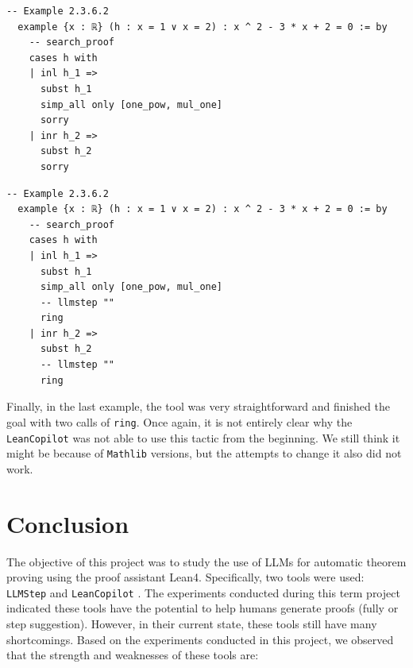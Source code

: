 \documentclass[12pt]{article}
\newcommand{\leancopilot}{\texttt{LeanCopilot} }
\newcommand{\llmstep}{\texttt{LLMStep} }
\begin{document}
\begin{minipage}{0.495\textwidth}
  \begin{lstlisting}[title={\leancopilot proof}]
  -- Example 2.3.6.2
  example {x : ℝ} (h : x = 1 ∨ x = 2) : x ^ 2 - 3 * x + 2 = 0 := by
    -- search_proof
    cases h with
    | inl h_1 =>
      subst h_1
      simp_all only [one_pow, mul_one]
      sorry
    | inr h_2 =>
      subst h_2
      sorry
  \end{lstlisting}
\end{minipage}
\vline
\begin{minipage}{0.495\textwidth}
  \begin{lstlisting}[title={\llmstep proof continuation}]
  -- Example 2.3.6.2
  example {x : ℝ} (h : x = 1 ∨ x = 2) : x ^ 2 - 3 * x + 2 = 0 := by
    -- search_proof
    cases h with
    | inl h_1 =>
      subst h_1
      simp_all only [one_pow, mul_one]
      -- llmstep ""
      ring
    | inr h_2 =>
      subst h_2
      -- llmstep ""
      ring
  \end{lstlisting}
\end{minipage}

Finally, in the last example, the tool was very straightforward and finished the goal with two calls of \texttt{ring}. Once again, it is not entirely clear why the \leancopilot was not able to use this tactic from the beginning. We still think it might be because of \texttt{Mathlib} versions, but the attempts to change it also did not work.


\section{Conclusion} \label{sec:conclusion}

The objective of this project was to study the use of LLMs for automatic theorem proving using the proof assistant Lean4. Specifically, two tools were used: \llmstep and \leancopilot. The experiments conducted during this term project indicated these tools have the potential to help humans generate proofs (fully or step suggestion). However, in their current state, these tools still have many shortcomings. Based on the experiments conducted in this project, we observed that the strength and weaknesses of these tools are:
\end{document}
